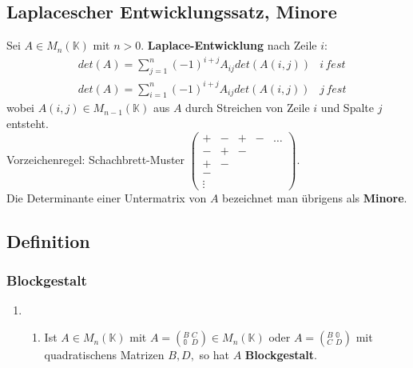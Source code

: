 \documentclass[titlepage]{article}
\newcommand{\K}{\mathbb{K}}
\newcommand{\1}{\mathbb{1}}
\newcommand{\0}{\mathbb{0}}
\begin{document}
			\subsection{Laplacescher Entwicklungssatz, Minore}
				Sei $A\in M_n(\K)$ mit $n>0.$ \textbf{Laplace-Entwicklung} nach Zeile $i$:
				\begin{align*}
					&det(A)=\sum^n_{j=1}(-1)^{i+j}A_{ij}det(A(i,j)) &i\,fest\\
					&det(A)=\sum\limits^n_{i=1}(-1)^{i+j}A_{ij}det(A(i,j)) &j\,fest
				\end{align*}
				wobei $A(i,j)\in M_{n-1}(\K)$ aus $A$ durch Streichen von Zeile $i$ und Spalte $j$ entsteht.\\
				Vorzeichenregel: Schachbrett-Muster $\left(\begin{smallmatrix}+&-&+&-&\dots\\-&+&-\\+&-\\-\\\vdots\end{smallmatrix}\right).$\\
				Die Determinante einer Untermatrix von $A$ bezeichnet man übrigens als \textbf{Minore}.
			\subsection{Definition}
				\subsubsection{Blockgestalt}
					\begin{enumerate}
						\item []
						\begin{enumerate}
							\item Ist $A\in M_n(\K)$ mit $A=(^B_\0\,^C_D)\in M_n(\K)$ oder $A=(^B_C\,^\0_D)$ mit quadratischens Matrizen $B,D,$ so hat $A$ \textbf{Blockgestalt}.
						\end{enumerate}
					\end{enumerate}
\end{document}
